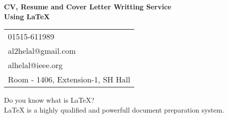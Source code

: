 \documentclass{article}
\begin{document}
\vspace*{\fill}
\begin{center}
  {\Huge\textbf{CV, Resume and Cover Letter Writting Service \\Using \LaTeX{}}}
\\
\LARGE
\vspace{2cm}
  \begin{tabular}{l}
 \faPhone{} 01515-611989\\
  \faEnvelope{} al2helal@gmail.com\\
  \faEnvelope{} alhelal@ieee.org\\
  \faHome{} Room - 1406, Extension-1, SH Hall
  \end{tabular}

\vspace{2cm}
Do you know what is \LaTeX{}?\\
\LaTeX{} is a highly qualified and powerfull document preparation system.
\end{center}
\vspace*{\fill}
 
\end{document}
